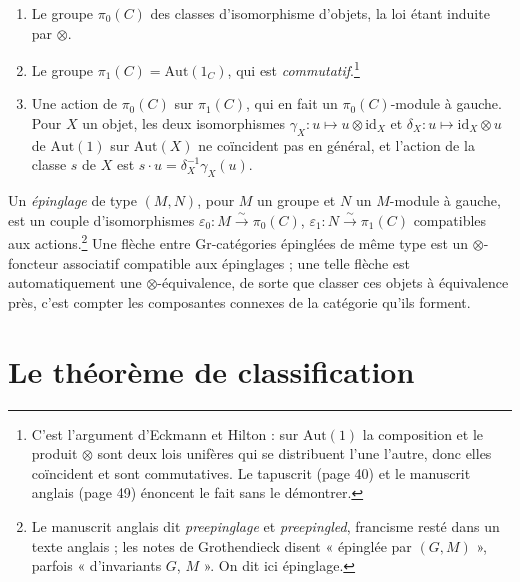 \documentclass[11pt,a4paper]{article}
\begin{document}
\begin{enumerate}
\item Le groupe $\pi_{0}(C)$ des classes d'isomorphisme d'objets, la loi étant
induite par $\otimes$.
\item Le groupe $\pi_{1}(C) = \mathrm{Aut}(1_{C})$, qui est
\emph{commutatif}.\footnote{C'est l'argument d'Eckmann et Hilton : sur
$\mathrm{Aut}(1)$ la composition et le produit $\otimes$ sont deux lois
unifères qui se distribuent l'une l'autre, donc elles coïncident et sont
commutatives. Le tapuscrit (page 40) et le manuscrit anglais (page 49)
énoncent le fait sans le démontrer.}
\item Une action de $\pi_{0}(C)$ sur $\pi_{1}(C)$, qui en fait un
$\pi_{0}(C)$-module à gauche. Pour $X$ un objet, les deux isomorphismes
$\gamma_{X} : u \mapsto u \otimes \mathrm{id}_{X}$ et $\delta_{X} : u \mapsto
\mathrm{id}_{X} \otimes u$ de $\mathrm{Aut}(1)$ sur $\mathrm{Aut}(X)$ ne
coïncident pas en général, et l'action de la classe $s$ de $X$ est
$s \cdot u = \delta_{X}^{-1}\gamma_{X}(u)$.
\end{enumerate}

Un \emph{épinglage} de type $(M,N)$, pour $M$ un groupe et $N$ un $M$-module
à gauche, est un couple d'isomorphismes $\varepsilon_{0} : M \xrightarrow{\sim}
\pi_{0}(C)$, $\varepsilon_{1} : N \xrightarrow{\sim} \pi_{1}(C)$ compatibles
aux actions.\footnote{Le manuscrit anglais dit \emph{preepinglage} et
\emph{preepingled}, francisme resté dans un texte anglais ; les notes de
Grothendieck disent « épinglée par $(G,M)$ », parfois « d'invariants $G$,
$M$ ». On dit ici épinglage.} Une flèche entre Gr-catégories épinglées de même
type est un $\otimes$-foncteur associatif compatible aux épinglages ; une
telle flèche est automatiquement une $\otimes$-équivalence, de sorte que
classer ces objets à équivalence près, c'est compter les composantes connexes
de la catégorie qu'ils forment.

\section*{Le théorème de classification}
\end{document}
